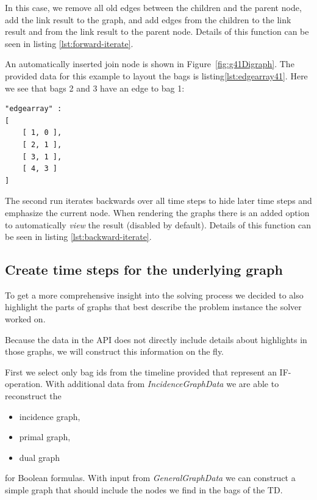 \documentclass[a4paper, 12pt, bibliography=totoc]{scrartcl}
\begin{document}
In this case, we remove all old edges between the children and the parent node, add the link result to the graph, and add edges from the children to the link result and from the link result to the parent node. Details of this function can be seen in listing \ref{lst:forward-iterate}.

An automatically inserted join node is shown in Figure~\ref{fig:g41Digraph}.
The provided data for this example to layout the bags is listing\ref{lst:edgearray41}. Here we see that bags 2 and 3 have an edge to bag 1:

\begin{lstlisting}[caption={Structure provided for bags of example \ref{fig:g41Digraph} },label={lst:edgearray41},numbers=none,backgroundcolor=\color{white}]
"edgearray" : 
[
	[ 1, 0 ],
	[ 2, 1 ],
	[ 3, 1 ],
	[ 4, 3 ]
]
\end{lstlisting}

The second run iterates backwards over all time steps to hide later time steps and emphasize the current node.
When rendering the graphs there is an added option to automatically \textit{view} the result (disabled by default). Details of this function can be seen in listing \ref{lst:backward-iterate}.

\subsection{Create time steps for the underlying graph}
To get a more comprehensive insight into the solving process we decided to also highlight the parts of graphs that best describe the problem instance the solver worked on.

Because the data in the API does not directly include details about highlights in those graphs, we will construct this information on the fly.

First we select only bag ids from the timeline provided that represent an IF-operation.
With additional data from \textit{IncidenceGraphData} we are able to reconstruct the
\begin{itemize}
	\item incidence graph,
	\item primal graph,
	\item dual graph
\end{itemize}
for Boolean formulas.
With input from \textit{GeneralGraphData} we can construct a simple graph that should include the nodes we find in the bags of the TD.
\end{document}
